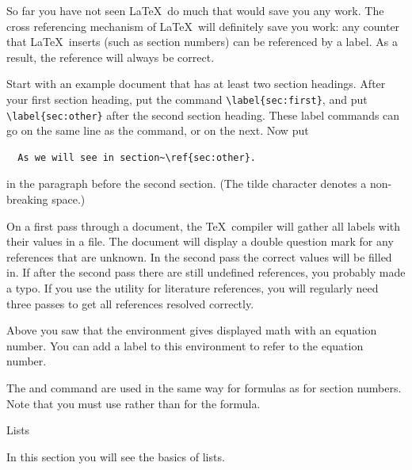 So far you have not seen \LaTeX\ do much that would save you any
work. The cross referencing mechanism of \LaTeX\ will definitely save
you work: any counter that \LaTeX\ inserts (such as section numbers)
can be referenced by a label. As a result, the reference will always
be correct.

Start with an example
document that has at least two section headings. After your first section
heading, put the command \verb+\label{sec:first}+,
and put \verb+\label{sec:other}+ after the second section
heading. These label commands can go on the same line as the
 command, or on the next.
Now put 
\begin{verbatim}
  As we will see in section~\ref{sec:other}.
\end{verbatim}
in the paragraph before the second section. (The tilde character
denotes a non-breaking space.) 

{On a first pass through a document, the \TeX\ compiler will gather
  all labels with their values in a  file. The document will
  display a double question mark for any references that are
  unknown. In the second pass the correct values will be filled
  in.}
{If after the second pass there are still undefined references, you
  probably made a typo. If you use the  utility for
  literature references, you will regularly need three passes to get
  all references resolved correctly.}

Above you saw that the  environment gives displayed
math with an equation number. You can add a label to this environment
to refer to the equation number.

{The \n{\\label} and \n{\\ref} command are used in the same way for
  formulas as for section numbers. Note that you must use
   rather than \n{\\[...\\]} for the formula.}{}

 {Lists}

\begin{purpose}
  In this section you will see the basics of lists.
\end{purpose}

